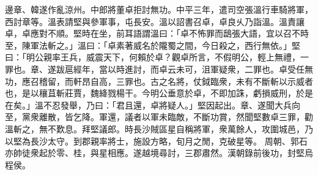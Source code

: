 \begin{pinyinscope}
 
邊章、韓遂作亂涼州。中郎將董卓拒討無功。中平三年，遣司空張溫行車騎將軍，西討章等。溫表請堅與參軍事，屯長安。溫以詔書召卓，卓良乆乃詣溫。溫責讓卓，卓應對不順。堅時在坐，前耳語謂溫曰：「卓不怖罪而鴟張大語，宜以召不時至，陳軍法斬之。」溫曰：「卓素著威名於隴蜀之間，今日殺之，西行無依。」堅曰：「明公親率王兵，威震天下，何賴於卓？觀卓所言，不假明公，輕上無禮，一罪也。章、遂跋扈經年，當以時進討，而卓云未可，沮軍疑衆，二罪也。卓受任無功，應召稽留，而軒昂自高，三罪也。古之名將，仗鉞臨衆，未有不斷斬以示威者也，是以穰苴斬莊賈，魏絳戮楊干。今明公垂意於卓，不即加誅，虧損威刑，於是在矣。」溫不忍發舉，乃曰：「君且還，卓將疑人。」堅因起出。章、遂聞大兵向至，黨衆離散，皆乞降。軍還，議者以軍未臨敵，不斷功賞，然聞堅數卓三罪，勸溫斬之，無不歎息。拜堅議郎。時長沙賊區星自稱將軍，衆萬餘人，攻圍城邑，乃以堅為長沙太守。到郡親率將士，施設方略，旬月之閒，克破星等。
 周朝、郭石亦帥徒衆起於零、桂，與星相應。遂越境尋討，三郡肅然。漢朝錄前後功，封堅烏程侯。
 

\end{pinyinscope}
